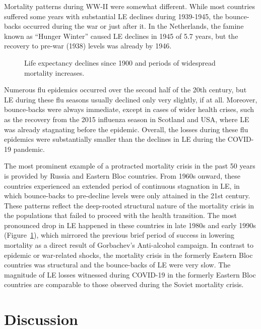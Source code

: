 \documentclass[12pt]{article}
\begin{document}
Mortality patterns during WW-II were somewhat different. While most countries suffered some years with substantial LE declines during 1939-1945, the bounce-backs occurred during the war or just after it. In the Netherlands, the famine known as ``Hunger Winter'' caused LE declines in 1945 of 5.7 years, but the recovery to pre-war (1938) levels was already  by 1946.\citealp{Lumey1994}

\begin{figure}[ht!]
    \centering
    \caption{Life expectancy declines since 1900 and periods of widespread mortality increases.}
    \label{fig:figure-6}
\end{figure}

Numerous flu epidemics occurred over the second half of the 20th century, but  LE during these flu seasons usually declined only very slightly, if at all. Moreover, bounce-backs were always immediate, except in cases of wider health crises, such as the recovery from the 2015 influenza season in Scotland and USA, where LE was already stagnating before the epidemic\citealp{Fenton2019}. Overall, the losses during these flu epidemics were substantially smaller than the declines in LE during the COVID-19 pandemic.

The most prominent example of a protracted mortality crisis in the past 50 years is provided by Russia and Eastern Bloc countries. From 1960s onward, these countries experienced an extended period of continuous stagnation in LE, in which bounce-backs to pre-decline levels were only attained in the 21st century.\citealp{Shkolnikov2013} These patterns reflect the deep-rooted structural nature of the mortality crisis in the populations that failed to proceed with the health transition.\citealp{Timonin2016} The most pronounced drop in LE happened in these countries in late 1980s and early 1990s (Figure~\ref{fig:figure-6}), which mirrored the previous brief period of success in lowering mortality\citealp{Zakharov1999} as a direct result of Gorbachev's Anti-alcohol campaign.\citealp{Leon2009} In contrast to epidemic or war-related shocks, the mortality crisis in the formerly Eastern Bloc countries was structural and the bounce-backs of LE were very slow. The magnitude of LE losses witnessed during COVID-19 in the formerly Eastern Bloc countries are comparable to those observed during the Soviet mortality crisis.

\section*{Discussion}
\end{document}
